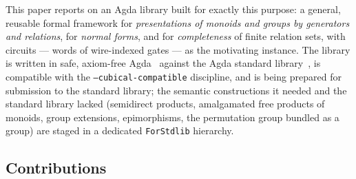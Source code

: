 This paper reports on an Agda library built for exactly this purpose: a
general, reusable formal framework for \emph{presentations of monoids and
groups by generators and relations}, for \emph{normal forms}, and for
\emph{completeness} of finite relation sets, with circuits --- words of
wire-indexed gates --- as the motivating instance.  The library is written in
safe, axiom-free Agda~\cite{norell2007thesis,bove2009agda} against the Agda
standard library~\cite{agdastdlib}, is compatible with the
\texttt{--cubical-compatible} discipline, and is being prepared for
submission to the standard library; the semantic constructions it needed and
the standard library lacked (semidirect products, amalgamated free products
of monoids, group extensions, epimorphisms, the permutation group bundled as
a group) are staged in a dedicated \texttt{ForStdlib} hierarchy.

\subsection{Contributions}\label{sec:contributions}

